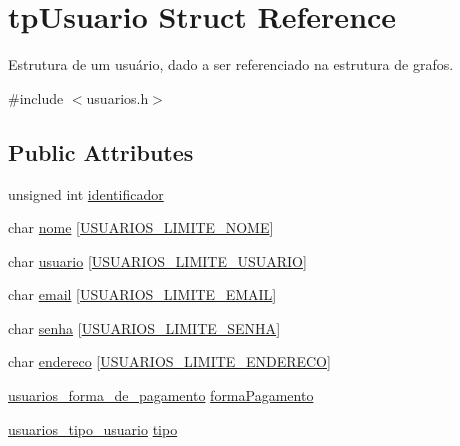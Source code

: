 \hypertarget{structtpUsuario}{}\section{tp\+Usuario Struct Reference}
\label{structtpUsuario}


Estrutura de um usuário, dado a ser referenciado na estrutura de grafos.  




{\ttfamily \#include $<$usuarios.\+h$>$}

\subsection*{Public Attributes}
\begin{DoxyCompactItemize}
\item 
unsigned int \hyperlink{structtpUsuario_abe85e036b63176d0197cbd9cbb909639}{identificador}
\item 
char \hyperlink{structtpUsuario_a069080ebc30772aa5fd2898e7678c105}{nome} \mbox{[}\hyperlink{usuarios_8h_a0366566babff2729e59e21514e8732fe}{U\+S\+U\+A\+R\+I\+O\+S\+\_\+\+L\+I\+M\+I\+T\+E\+\_\+\+N\+O\+ME}\mbox{]}
\item 
char \hyperlink{structtpUsuario_a9c879decf8352b2665264210b50d16a0}{usuario} \mbox{[}\hyperlink{usuarios_8h_a8643d53df87a8395a3665ebc203d9277}{U\+S\+U\+A\+R\+I\+O\+S\+\_\+\+L\+I\+M\+I\+T\+E\+\_\+\+U\+S\+U\+A\+R\+IO}\mbox{]}
\item 
char \hyperlink{structtpUsuario_a673f3e426609e9e216190ebd1f2d2fd5}{email} \mbox{[}\hyperlink{usuarios_8h_a75359d1394ac8ddf5e80583806d54623}{U\+S\+U\+A\+R\+I\+O\+S\+\_\+\+L\+I\+M\+I\+T\+E\+\_\+\+E\+M\+A\+IL}\mbox{]}
\item 
char \hyperlink{structtpUsuario_a6ee0e2c16c084ede5698b3df0b10a590}{senha} \mbox{[}\hyperlink{usuarios_8h_a66457e61856e5ef8d5f67f16ce7c1145}{U\+S\+U\+A\+R\+I\+O\+S\+\_\+\+L\+I\+M\+I\+T\+E\+\_\+\+S\+E\+N\+HA}\mbox{]}
\item 
char \hyperlink{structtpUsuario_a7e58e7062d1b1bdd6e9da9468ef28d71}{endereco} \mbox{[}\hyperlink{usuarios_8h_a7908c27ee8c55761009d28c5e71980f4}{U\+S\+U\+A\+R\+I\+O\+S\+\_\+\+L\+I\+M\+I\+T\+E\+\_\+\+E\+N\+D\+E\+R\+E\+CO}\mbox{]}
\item 
\hyperlink{usuarios_8h_a4bab9043377c07c5263f43aea2ae7e1d}{usuarios\+\_\+forma\+\_\+de\+\_\+pagamento} \hyperlink{structtpUsuario_ac5b8fc1dc26fe1c047dfa0c18801502a}{forma\+Pagamento}
\item 
\hyperlink{usuarios_8h_aa2a00b8c6c7832d541985ec93d0b12e3}{usuarios\+\_\+tipo\+\_\+usuario} \hyperlink{structtpUsuario_abaed1508280c5655463a1ceae4cb3050}{tipo}

\end{DoxyCompactItemize}
